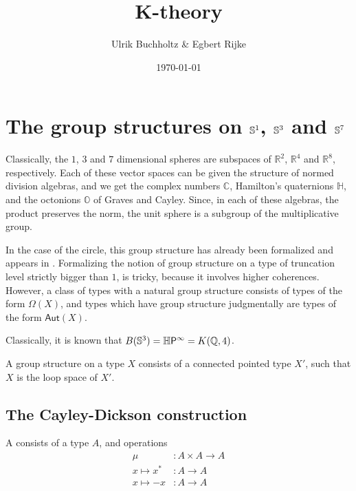 \documentclass{article}
\title{K-theory}
\date{\today}
\author{Ulrik Buchholtz \& Egbert Rijke}
\begin{document}
\maketitle

\tableofcontents

\section{The group structures on $\mathbb{S}^1$, $\mathbb{S}^3$ and $\mathbb{S}^7$}
Classically, the $1$, $3$ and $7$ dimensional spheres are subspaces of $\mathbb{R}^2$,
$\mathbb{R}^4$ and $\mathbb{R}^8$, respectively. Each of these vector spaces can be
given the structure of normed division algebras, and we get the complex numbers
$\mathbb{C}$, Hamilton's quaternions $\mathbb{H}$, and the octonions $\mathbb{O}$
of Graves and Cayley. Since, in each of these algebras, the product preserves
the norm, the unit sphere is a subgroup of the multiplicative group.

In the case of the circle, this group structure has already been formalized and
appears in \cite{TheBook}. Formalizing the notion of group structure on a type
of truncation level strictly bigger than $1$, is tricky, because it involves
higher coherences. However, a class of types with a natural group structure
consists of types of the form $\Omega(X)$, and types which have group structure
judgmentally are types of the form $\mathsf{Aut}(X)$. 

Classically, it is known that $B(\mathbb{S}^3)=\mathbb{H}\mathsf{P}^\infty=K(\mathbb{Q},4)$. 

\begin{defn}
A group structure on a type $X$ consists of a connected pointed type $X'$, such
that $X$ is the loop space of $X'$.
\end{defn}

\subsection{The Cayley-Dickson construction}

\begin{defn}
A  consists of a type $A$, and operations
\begin{align*}
\mu & : A\times A\to A \\
x\mapsto x^\ast & : A\to A \\
x\mapsto -x & : A\to A
\end{align*}
\end{defn}
\end{document}

